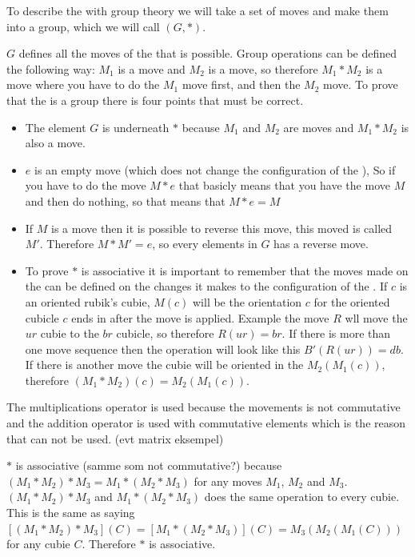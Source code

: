 To describe the \rubik{} with group theory we will take a set of moves and make them into a group, which we will call $(G, *)$.

$G$ defines all the moves of the \rubik{} that is possible. Group operations can be defined the following way: $M_1$ is a move and $M_2$ is a move, so therefore $M_1 * M_2$ is a move where you have to do the $M_1$ move first, and then the $M_2$ move. To prove that the \rubik{} is a group there is four points that must be correct.

\begin {itemize}
\item The element $G$ is underneath $*$ because $M_1$ and $M_2$ are moves  and $M_1 * M_2$ is also a move.

\item $e$ is an empty move (which does not change the configuration of the \rubik{}), So if you have to do the move $M * e$ that basicly means that you have the move $M$ and then do nothing, so that means that $M*e=M$

\item If $M$ is a move then it is possible to reverse this move, this moved is called $M'$. Therefore $M*M' = e$, so every elements in $G$ has a reverse move.

\item To prove $*$ is associative it is important to remember that the moves made on the \rubik{} can be defined on the changes it makes to the configuration of the \rubik{}. 
If $c$ is an oriented rubik's cubie, $M(c)$ will be the orientation $c$ for the oriented cubicle $c$ ends in after the move is applied.
Example the move $R$ wll move the $ur$ cubie to the $br$ cubicle, so therefore $R(ur)=br$. If there is more than one move sequence then the operation will look like this $B'(R(ur))=db$. If there is another move the cubie will be oriented in the $M_2 (M_1 (c))$, therefore $(M_1 *M_2 )(c)=M_2 (M_1 (c))$. 

\end {itemize}

The multiplications operator is used because the \rubik{} movements is not commutative and the addition operator is used with commutative elements which is the reason that can not be used. (evt matrix eksempel) %

$*$ is associative (samme som not commutative?) because $(M_1 *M_2 )*M_3 = M_1 *(M_2 *M_3 )$ for any moves $M_1$, $M_2$ and $M_3$. $(M_1 *M_2 )*M_3$ and $M_1 *(M_2 *M_3 )$ does the same operation to every cubie. This is the same as saying $[(M_1 *M_2 )*M_3 ](C)=[M_1 *(M_2 *M_3 )](C)=M_3 (M_2 (M_1 (C)))$ for any cubie $C$. Therefore $*$ is associative.

